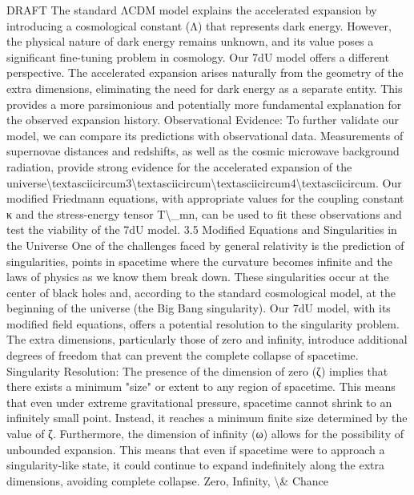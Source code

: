 \documentclass[12pt]{article}
\begin{document}
DRAFT
The standard ΛCDM model explains the accelerated expansion by introducing a
cosmological constant (Λ) that represents dark energy. However, the physical nature of
dark energy remains unknown, and its value poses a signiﬁcant ﬁne-tuning problem in
cosmology.
Our 7dU model oﬀers a diﬀerent perspective. The accelerated expansion arises
naturally from the geometry of the extra dimensions, eliminating the need for dark
energy as a separate entity. This provides a more parsimonious and potentially more
fundamental explanation for the observed expansion history.
Observational Evidence:
To further validate our model, we can compare its predictions with observational data.
Measurements of supernovae distances and redshifts, as well as the cosmic
microwave background radiation, provide strong evidence for the accelerated
expansion of the universe\textbackslash{}textasciicircum{}3\textbackslash{}textasciicircum{}\textbackslash{}textasciicircum{}4\textbackslash{}textasciicircum{}. Our modiﬁed Friedmann equations, with appropriate
values for the coupling constant κ and the stress-energy tensor T\textbackslash{}_mn, can be used to
ﬁt these observations and test the viability of the 7dU model.
3.5 Modiﬁed Equations and Singularities in the Universe
One of the challenges faced by general relativity is the prediction of singularities, points in
spacetime where the curvature becomes inﬁnite and the laws of physics as we know them break
down. These singularities occur at the center of black holes and, according to the standard
cosmological model, at the beginning of the universe (the Big Bang singularity).
Our 7dU model, with its modiﬁed ﬁeld equations, oﬀers a potential resolution to the singularity
problem. The extra dimensions, particularly those of zero and inﬁnity, introduce additional degrees
of freedom that can prevent the complete collapse of spacetime.
Singularity Resolution:
The presence of the dimension of zero (ζ) implies that there exists a minimum "size" or extent to any
region of spacetime. This means that even under extreme gravitational pressure, spacetime cannot
shrink to an inﬁnitely small point. Instead, it reaches a minimum ﬁnite size determined by the value
of ζ.
Furthermore, the dimension of inﬁnity (ω) allows for the possibility of unbounded expansion. This
means that even if spacetime were to approach a singularity-like state, it could continue to expand
indeﬁnitely along the extra dimensions, avoiding complete collapse.
Zero, Infinity, \textbackslash{}& Chance
\end{document}
